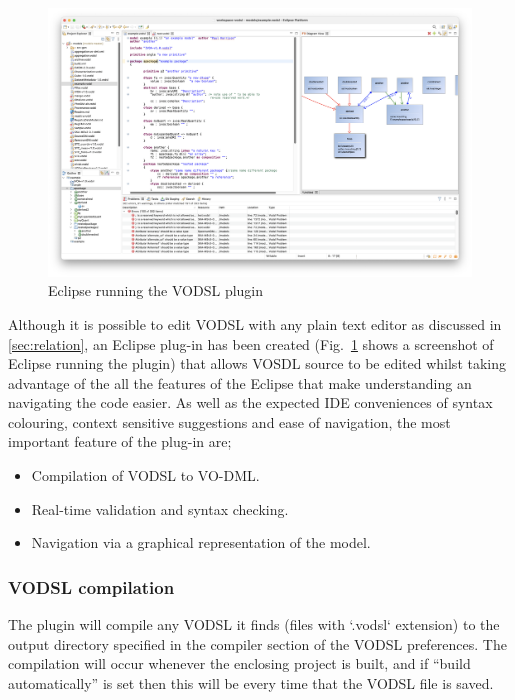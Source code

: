 \documentclass[11pt,a4paper]{ivoa}
\begin{document}
\begin{figure}
\centering
\includegraphics[width=\textwidth]{eclipsevodsl.png}
\caption{Eclipse running the VODSL plugin}
\label{fig:eclipsevodsl}
\end{figure}


Although it is possible to edit VODSL with any plain text editor as discussed in \ref{sec:relation}, an Eclipse plug-in has been 
created (Fig.~\ref{fig:eclipsevodsl} shows a screenshot of Eclipse running the plugin) that allows VOSDL source to be edited whilst
 taking advantage of the all the features of the Eclipse that make understanding an navigating the code
easier. As well as the expected IDE conveniences of syntax colouring, context sensitive suggestions and ease of navigation,
 the most important feature of the plug-in are;

\begin{itemize}
  \item Compilation of VODSL to VO-DML.
  \item Real-time validation and syntax checking.
  \item Navigation via a graphical representation of the model.
\end{itemize}

\subsubsection{VODSL compilation}

The plugin will compile any VODSL it finds (files with `.vodsl` extension) 
to the output directory specified in the compiler section of the VODSL preferences. 
The compilation will occur whenever the enclosing project is built, and if ``build automatically''
is set then this will be every time that the VODSL file is saved.
\end{document}

